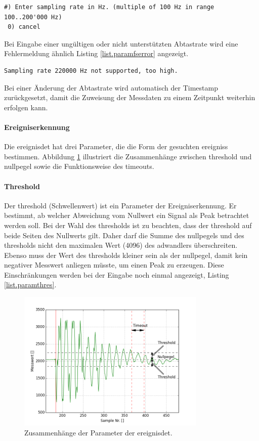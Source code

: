 \begin{lstlisting}[caption=Untermenü Abtastrate, label=list.paramfs]
 #) Enter sampling rate in Hz. (multiple of 100 Hz in range 100..200'000 Hz)
 0) cancel
\end{lstlisting}

Bei Eingabe einer ungültigen oder nicht unterstützten Abtastrate wird eine Fehlermeldung ähnlich Listing \ref{list.paramfserror} angezeigt.

\begin{lstlisting}[caption=Fehlermeldung bei ungültiger Abtastrate, label=list.paramfserror]
Sampling rate 220000 Hz not supported, too high.
\end{lstlisting}

Bei einer Änderung der Abtastrate wird automatisch der Timestamp zurückgesetzt, damit die Zuweisung der Messdaten zu einem Zeitpunkt weiterhin erfolgen kann.

\paragraph{Ereigniserkennung} Die \gls{ereignisdet} hat drei Parameter, die die Form der gesuchten \glspl{ereignis} bestimmen.  Abbildung \ref{fig.params} illustriert die Zusammenhänge zwischen \gls{threshold} und \gls{nullpegel} sowie die Funktionsweise des \gls{timeout}s.

\paragraph{Threshold} Der \gls{threshold} (Schwellenwert) ist ein Parameter der Ereigniserkennung. Er bestimmt, ab welcher Abweichung vom Nullwert ein Signal als Peak betrachtet werden soll. Bei der Wahl des \gls{threshold}s ist zu beachten, dass der \gls{threshold} auf beide Seiten des Nullwerts gilt. Daher darf die Summe des \gls{nullpegel}s und des \gls{threshold}s nicht den maximalen Wert (4096) des \gls{adwandler}s überschreiten. Ebenso muss der Wert des \gls{threshold}s kleiner sein als der \gls{nullpegel}, damit kein negativer Messwert anliegen müsste, um einen Peak zu erzeugen. Diese Einschränkungen werden bei der Eingabe noch einmal angezeigt, Listing \ref{list.paramthres}.

\begin{figure}
	\centering
		\includegraphics[width=0.8\textwidth]{images/impact_params.png}
	\caption{Zusammenhänge der Parameter der \gls{ereignisdet}.}
	\label{fig.params}
\end{figure}

